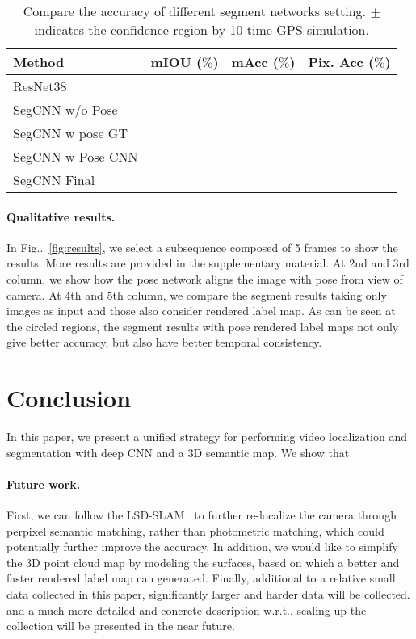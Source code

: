 \documentclass[10pt,twocolumn,letterpaper]{article}
\makeatletter
\newcommand{\figref}[1]{Fig\onedot~\ref{#1}}
\DeclareRobustCommand\onedot{\futurelet\@let@token\@onedot}
\def\onedot{\ifx\@let@token.\else.\null\fi\xspace}
\def\wrt{w.r.t\onedot}
\makeatother
\begin{document}
\begin{table}[t]
\center
\small
\begin{tabular}{lccc}
\toprule[0.1 em]
Method &  mIOU ($\%$) & mAcc ($\%$) & Pix. Acc ($\%$)\\
\hline 
ResNet38~\cite{WuSH16e} & & &  \\
SegCNN w/o Pose & & & \\
SegCNN w pose GT & & & \\
SegCNN w Pose CNN & & & \\
SegCNN Final & & & \\
\toprule[0.1 em]
\end{tabular}
\caption{Compare the accuracy of different segment networks setting. $\pm$ indicates the confidence region by 10 time GPS simulation.}
\label{tbl:segment}
\vspace{-0.3\baselineskip}
\end{table}

\paragraph{Qualitative results.} In \figref{fig:results}, we select a subsequence composed of 5 frames to show the results. More results are provided in the supplementary material. At 2nd and 3rd column, we show how the pose network aligns the image with pose from view of camera. At 4th and 5th column, we compare the segment results taking only images as input and those also consider rendered label map. As can be seen at the circled regions, the segment results with pose rendered label maps not only give better accuracy, but also have better temporal consistency.
\begin{figure*}[t]
\fbox{\rule{0pt}{2in} \rule{.9\linewidth}{0pt}}
   \caption{Results from each intermediate stage out of the system.}
\label{fig:results}
\end{figure*}


\section{Conclusion}
\label{sec:conclusion}
In this paper, we present a unified strategy for performing video localization and segmentation with deep CNN and a 3D semantic map. We show that 

\paragraph{Future work.} First, we can follow the LSD-SLAM~\cite{engel2014lsd} to further re-localize the camera through perpixel semantic matching, rather than photometric matching, which could potentially further improve the accuracy. In addition, we would like to simplify the 3D point cloud map by modeling the surfaces, based on which a better and faster rendered label map can generated.
Finally, additional to a relative small data collected in this paper, significantly larger and harder data will be collected. and a much more detailed and concrete description \wrt scaling up the collection will be presented in the near future. 

% 
{\small


}
\end{document}
